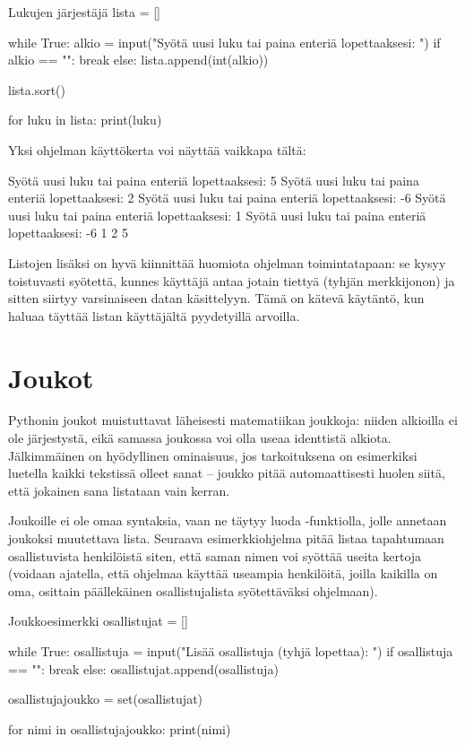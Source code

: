 \begin{example}{Lukujen järjestäjä}
lista = []

while True:
	alkio = input("Syötä uusi luku tai paina enteriä lopettaaksesi: ")
	if alkio == "":
		break
	else:
		lista.append(int(alkio))

lista.sort()

for luku in lista:
	print(luku)
\end{example}

Yksi ohjelman käyttökerta voi näyttää vaikkapa tältä:

\begin{output}
Syötä uusi luku tai paina enteriä lopettaaksesi: 5
Syötä uusi luku tai paina enteriä lopettaaksesi: 2
Syötä uusi luku tai paina enteriä lopettaaksesi: -6
Syötä uusi luku tai paina enteriä lopettaaksesi: 1
Syötä uusi luku tai paina enteriä lopettaaksesi: 
-6
1
2
5
\end{output}

Listojen lisäksi on hyvä kiinnittää huomiota ohjelman toimintatapaan: se kysyy toistuvasti syötettä, kunnes käyttäjä antaa jotain tiettyä (tyhjän merkkijonon) ja sitten siirtyy varsinaiseen datan käsittelyyn. Tämä on kätevä käytäntö, kun haluaa täyttää listan käyttäjältä pyydetyillä arvoilla.

\section{Joukot}

Pythonin joukot muistuttavat läheisesti matematiikan joukkoja: niiden alkioilla ei ole järjestystä, eikä samassa joukossa voi olla useaa identtistä alkiota. Jälkimmäinen on hyödyllinen ominaisuus, jos tarkoituksena on esimerkiksi luetella kaikki tekstissä olleet sanat -- joukko pitää automaattisesti huolen siitä, että jokainen sana listataan vain kerran.

Joukoille ei ole omaa syntaksia, vaan ne täytyy luoda -funktiolla, jolle annetaan joukoksi muutettava lista. Seuraava esimerkkiohjelma pitää listaa tapahtumaan osallistuvista henkilöistä siten, että saman nimen voi syöttää useita kertoja (voidaan ajatella, että ohjelmaa käyttää useampia henkilöitä, joilla kaikilla on oma, osittain päällekäinen osallistujalista syötettäväksi ohjelmaan).

\begin{example}{Joukkoesimerkki}
osallistujat = []

while True:
	osallistuja = input("Lisää osallistuja (tyhjä lopettaa): ")
	if osallistuja == "":
		break
	else:
		osallistujat.append(osallistuja)

osallistujajoukko = set(osallistujat)

for nimi in osallistujajoukko:
	print(nimi)
\end{example}

